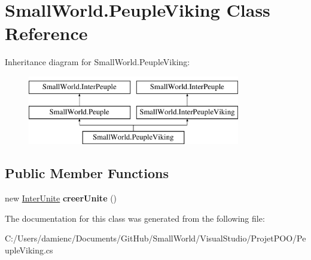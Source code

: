 \hypertarget{class_small_world_1_1_peuple_viking}{\section{Small\-World.\-Peuple\-Viking Class Reference}
\label{class_small_world_1_1_peuple_viking}
}
Inheritance diagram for Small\-World.\-Peuple\-Viking\-:\begin{figure}[H]
\begin{center}
\leavevmode
\includegraphics[height=3.000000cm]{class_small_world_1_1_peuple_viking}
\end{center}
\end{figure}
\subsection*{Public Member Functions}
\begin{DoxyCompactItemize}
\item 
\hypertarget{class_small_world_1_1_peuple_viking_a20c5bf72b170cc2ee7af3732b6db3367}{new \hyperlink{interface_small_world_1_1_inter_unite}{Inter\-Unite} {\bfseries creer\-Unite} ()}\label{class_small_world_1_1_peuple_viking_a20c5bf72b170cc2ee7af3732b6db3367}

\end{DoxyCompactItemize}


The documentation for this class was generated from the following file\-:\begin{DoxyCompactItemize}
\item 
C\-:/\-Users/damienc/\-Documents/\-Git\-Hub/\-Small\-World/\-Visual\-Studio/\-Projet\-P\-O\-O/Peuple\-Viking.\-cs\end{DoxyCompactItemize}
